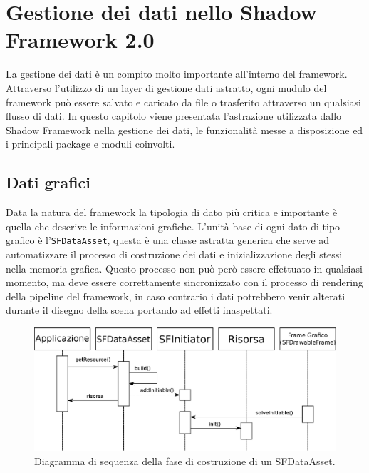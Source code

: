 
\chapter{Gestione dei dati nello Shadow Framework 2.0}
\label{ch:gestionedati}

La gestione dei dati \`e un compito molto importante all'interno del framework. Attraverso l'utilizzo di un layer di gestione dati astratto, ogni mudulo del framework pu\`o essere salvato e caricato da file o trasferito attraverso un qualsiasi flusso di dati.
In questo capitolo viene presentata l'astrazione utilizzata dallo Shadow Framework nella gestione dei dati, le funzionalit\`a messe a disposizione ed i principali package e moduli coinvolti.

\section{Dati grafici}
\label{sec:dati grafici}
Data la natura del framework la tipologia di dato pi\`u critica e importante \`e quella che descrive le informazioni grafiche. 
L'unit\`a base di ogni dato di tipo grafico \`e l'\texttt{SFDataAsset}, questa \`e una classe astratta generica che serve ad automatizzare il processo di costruzione dei dati e inizializzazione degli stessi nella memoria grafica. Questo processo non pu\`o per\`o essere effettuato in qualsiasi momento, ma deve essere correttamente sincronizzato con il processo di rendering della pipeline del framework, in caso contrario i dati potrebbero venir alterati durante il disegno della scena portando ad effetti inaspettati.

\begin{figure}
\begin{center}
\includegraphics[width=\textwidth]{Immagini/sequenzaDataAsset}
\caption[Diagramma della fase di costruzione di un SFDataAsset.]{Diagramma di sequenza della fase di costruzione di un SFDataAsset.\label{f:seqdataasset}} 
\end{center} 
\end{figure}

